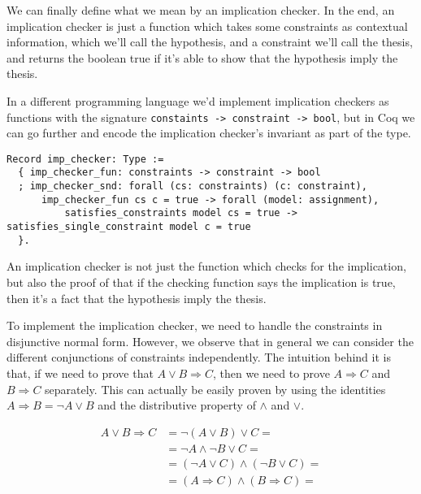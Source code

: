 We can finally define what we mean by an implication checker. In the end, an implication checker is just
a function which takes some constraints as contextual information, which we'll call the hypothesis, and a
constraint we'll call the thesis, and returns the boolean true if it's able to show that the hypothesis
imply the thesis.

In a different programming language we'd implement implication checkers as functions with the signature
\texttt{constaints -> constraint -> bool}, but in Coq we can go further and encode the implication checker's
invariant as part of the type.

\begin{verbatim}
Record imp_checker: Type := 
  { imp_checker_fun: constraints -> constraint -> bool
  ; imp_checker_snd: forall (cs: constraints) (c: constraint),
      imp_checker_fun cs c = true -> forall (model: assignment),
          satisfies_constraints model cs = true -> satisfies_single_constraint model c = true
  }.
\end{verbatim}

An implication checker is not just the function which checks for the implication, but also the proof of
that if the checking function says the implication is true, then it's a fact that the hypothesis imply the
thesis.

To implement the implication checker, we need to handle the constraints in disjunctive normal form. However,
we observe that in general we can consider the different conjunctions of constraints independently. The
intuition behind it is that, if we need to prove that $A \vee B \Rightarrow C$, then we need to prove $A \Rightarrow C$ and 
$B \Rightarrow C$ separately. This can actually be easily proven by using the identities $A \Rightarrow B = \neg A \vee B$ and
the distributive property of $\wedge$ and $\vee$.

\begin{align*}
A \vee B \Rightarrow C &= \neg (A \vee B) \vee C = \\
                       &= \neg A \wedge \neg B \vee C = \\
                       &= (\neg A \vee C)\wedge (\neg B \vee C) = \\
                       &= (A \Rightarrow C)\wedge (B \Rightarrow C) = \\
\end{align*}


